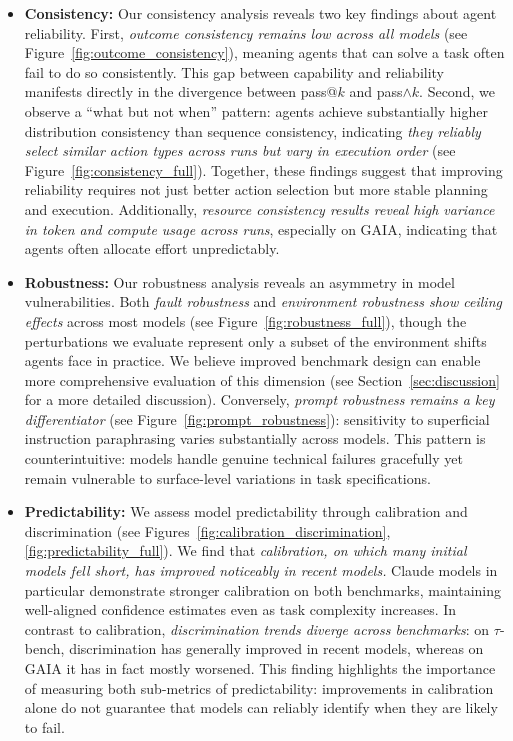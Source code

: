 \documentclass[11pt]{article}
\newcounter{dimension}
\begin{document}
\begin{itemize}[leftmargin=*, topsep=1pt, itemsep=2pt]
\item \textbf{Consistency:} Our consistency analysis reveals two key findings about agent reliability. First, \textit{outcome consistency remains low across all models} (see Figure~\ref{fig:outcome_consistency}), meaning agents that can solve a task often fail to do so consistently. This gap between capability and reliability manifests directly in the divergence between pass@$k$ and pass$\wedge k$. Second, we observe a ``what but not when'' pattern: agents achieve substantially higher distribution consistency than sequence consistency, indicating \textit{they reliably select similar action types across runs but vary in execution order} (see Figure~\ref{fig:consistency_full}). Together, these findings suggest that improving reliability requires not just better action selection but more stable planning and execution. Additionally, \textit{resource consistency results reveal high variance in token and compute usage across runs}, especially on GAIA, indicating that agents often allocate effort unpredictably.

    \item \textbf{Robustness:} Our robustness analysis reveals an asymmetry in model vulnerabilities. Both \textit{fault robustness} and \textit{environment robustness show ceiling effects} across most models (see Figure~\ref{fig:robustness_full}), though the perturbations we evaluate represent only a subset of the environment shifts agents face in practice. We believe improved benchmark design can enable more comprehensive evaluation of this dimension (see Section~\ref{sec:discussion} for a more detailed discussion). Conversely, \textit{prompt robustness remains a key differentiator} (see Figure~\ref{fig:prompt_robustness}): sensitivity to superficial instruction paraphrasing varies substantially across models. This pattern is counterintuitive: models handle genuine technical failures gracefully yet remain vulnerable to surface-level variations in task specifications.

    \item \textbf{Predictability:}
    We assess model predictability through calibration and discrimination (see Figures~\ref{fig:calibration_discrimination}, \ref{fig:predictability_full}). We find that \textit{calibration, on which many initial models fell short, has improved noticeably in recent models.} Claude models in particular demonstrate stronger calibration on both benchmarks, maintaining well-aligned confidence estimates even as task complexity increases. In contrast to calibration, \textit{discrimination trends diverge across benchmarks}: on $\tau$-bench, discrimination has generally improved in recent models, whereas on GAIA it has in fact mostly worsened. This finding highlights the importance of measuring both sub-metrics of predictability: improvements in calibration alone do not guarantee that models can reliably identify when they are likely to fail.


\end{itemize}
\end{document}
